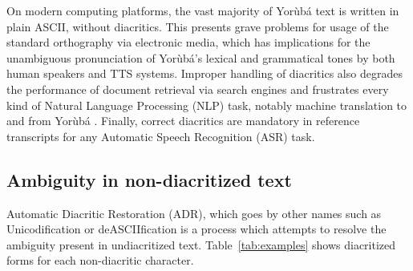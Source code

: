\documentclass[a4paper]{article}
\begin{document}
On modern computing platforms, the vast majority of Yor{\`u}b{\'a} text is written in plain ASCII, without diacritics. This presents grave problems for usage of the standard orthography via electronic media, which has implications for the unambiguous pronunciation of Yor{\`u}b{\'a}'s lexical and grammatical tones by both human speakers and TTS systems. Improper handling of diacritics also degrades the performance of document retrieval via search engines and frustrates every kind of Natural Language Processing (NLP) task, notably machine translation to and from Yor{\`u}b{\'a} \cite{asubiaro2014effects}. Finally, correct diacritics are mandatory in reference transcripts for any Automatic Speech Recognition (ASR) task.

\subsection{Ambiguity in non-diacritized text}
Automatic Diacritic Restoration (ADR), which goes by other names such as Unicodification \cite{scannell2011statistical} or deASCIIfication \cite{arslan2016deasciification} is a process which attempts to resolve the ambiguity present in undiacritized text. Table~\ref{tab:examples} shows diacritized forms for each non-diacritic character. 
\end{document}
